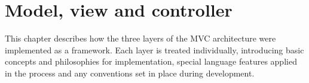 \chapter{Model, view and controller}
\label{chap_mvc_start}
This chapter describes how the three layers of the MVC architecture were implemented as a framework. Each layer is treated individually, introducing basic concepts and philosophies for implementation, special language features applied in the process and any conventions set in place during development.